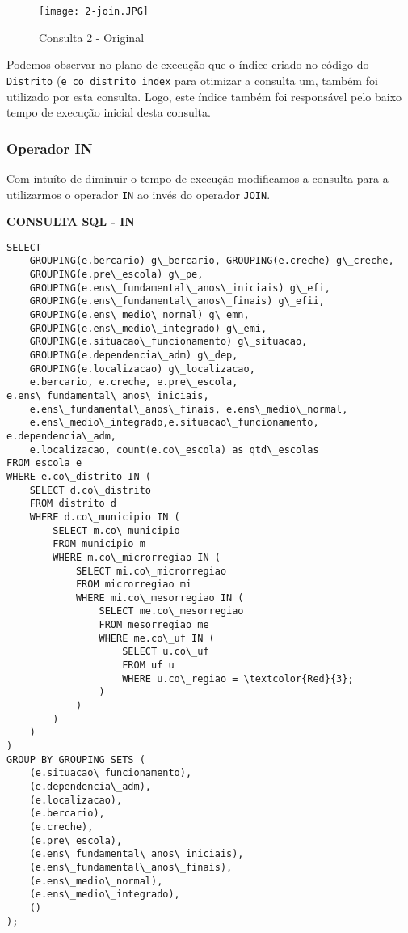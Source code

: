 \documentclass[12pt,a4paper]{article}
\begin{document}
\begin{figure}[H]
    \centering
    \texttt{[image: 2-join.JPG]}
    \caption{Consulta 2 - Original}
    \label{fig:diagrama}
\end{figure}

Podemos observar no plano de execução que o índice criado no código do \texttt{Distrito} (\texttt{e\_co\_distrito\_index} para otimizar a consulta um, também foi utilizado por esta consulta. Logo, este índice também foi responsável pelo baixo tempo de execução inicial desta consulta.

\subsubsection{Operador IN}

Com intuíto de diminuir o tempo de execução modificamos a consulta para a utilizarmos o operador \texttt{IN} ao invés do operador \texttt{JOIN}.

\vspace{0.5cm}

\begin{flushleft}
\textbf{CONSULTA SQL - IN}\\
\end{flushleft}

\begin{Verbatim}[commandchars=\\\{\}]
SELECT
    GROUPING(e.bercario) g\_bercario, GROUPING(e.creche) g\_creche, 
    GROUPING(e.pre\_escola) g\_pe,
    GROUPING(e.ens\_fundamental\_anos\_iniciais) g\_efi,
    GROUPING(e.ens\_fundamental\_anos\_finais) g\_efii, 
    GROUPING(e.ens\_medio\_normal) g\_emn,
    GROUPING(e.ens\_medio\_integrado) g\_emi, 
    GROUPING(e.situacao\_funcionamento) g\_situacao,
    GROUPING(e.dependencia\_adm) g\_dep, 
    GROUPING(e.localizacao) g\_localizacao,
    e.bercario, e.creche, e.pre\_escola, e.ens\_fundamental\_anos\_iniciais,
    e.ens\_fundamental\_anos\_finais, e.ens\_medio\_normal,
    e.ens\_medio\_integrado,e.situacao\_funcionamento, e.dependencia\_adm, 
    e.localizacao, count(e.co\_escola) as qtd\_escolas
FROM escola e
WHERE e.co\_distrito IN (
    SELECT d.co\_distrito
    FROM distrito d
    WHERE d.co\_municipio IN (
        SELECT m.co\_municipio
        FROM municipio m
        WHERE m.co\_microrregiao IN (
            SELECT mi.co\_microrregiao
            FROM microrregiao mi
            WHERE mi.co\_mesorregiao IN (
                SELECT me.co\_mesorregiao
                FROM mesorregiao me
                WHERE me.co\_uf IN (
                    SELECT u.co\_uf
                    FROM uf u
                    WHERE u.co\_regiao = \textcolor{Red}{3};
                )
            )
        )
    )
)
GROUP BY GROUPING SETS (
    (e.situacao\_funcionamento),
    (e.dependencia\_adm),
    (e.localizacao),
    (e.bercario),
    (e.creche),
    (e.pre\_escola),
    (e.ens\_fundamental\_anos\_iniciais),
    (e.ens\_fundamental\_anos\_finais),
    (e.ens\_medio\_normal),
    (e.ens\_medio\_integrado),
    ()
);
\end{Verbatim}
\end{document}
